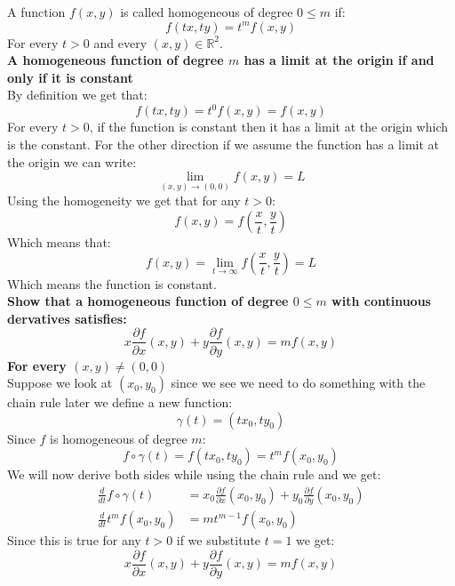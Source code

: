 \documentclass{article}
\theoremstyle{plain}
\newcommand{\R}{\mathbb{R}}
\begin{document}
	\newpage
	
	A function $f(x,y)$ is called homogeneous of degree $0 \le m$ if:
	\[
		f(tx,ty) = t^m f(x,y)
	\]
	For every $t > 0$ and every $(x,y) \in \R^2$. \\
	\textbf{A homogeneous function of degree $m$ has a limit at the origin
	if and only if it is constant} \\
	By definition we get that:
	\[
		f(tx,ty) = t^0 f(x,y) = f(x,y)
	\]
	For every $t > 0$, if the function is constant then it has a limit
	at the origin which is the constant. For the other direction if
	we assume the function has a limit at the origin we can write:
	\[
		\lim_{(x,y)\to(0,0)}{f(x,y)} = L
	\]
	Using the homogeneity we get that for any $t > 0$:
	\[
		f(x,y) = f\left(\frac{x}{t},\frac{y}{t}\right)
	\]
	Which means that:
	\[
		f(x,y) = \lim_{t\to\infty}{f\left(\frac{x}{t},\frac{y}{t}\right)} = L
	\]
	Which means the function is constant. \\
	\textbf{Show that a homogeneous function of degree $0 \le m$ with
	continuous dervatives satisfies:
	\[
		x \frac{\partial f}{\partial x}(x,y) + 
		y \frac{\partial f}{\partial y}(x,y) = 
		mf(x,y)
	\]
	For every $(x,y) \neq (0,0)$} \\
	Suppose we look at $(x_0,y_0)$ since we see we need to do something
	with the chain rule later we define a new function:
	\[
		\gamma(t) = (tx_0,ty_0)
	\]
	Since $f$ is homogeneous of degree $m$:
	\[
		f\circ\gamma(t) = f(tx_0,ty_0) = t^mf(x_0,y_0)
	\]
	We will now derive both sides while using the chain rule and we get:
	\begin{align*}
		\frac{d}{dt}f\circ\gamma(t) &= 
		x_0 \frac{\partial f}{\partial x}(x_0,y_0) + 
		y_0 \frac{\partial f}{\partial y}(x_0,y_0) \\
		\frac{d}{dt}t^mf(x_0,y_0) &= mt^{m-1}f(x_0,y_0)
	\end{align*}
	Since this is true for any $t > 0$ if we substitute $t = 1$ we get:
	\[
		x \frac{\partial f}{\partial x}(x,y) + 
		y \frac{\partial f}{\partial y}(x,y) = 
		mf(x,y)
	\]
	
	\newpage
	\iffalse
	\textbf{Show that any homogeneous function can be written as:
	\[
		f(x,y) = x^m F\left(\frac{y}{x}\right)
	\]
	For any $x \neq 0$} \\
	This is true because without loss of generality assume $x > 0$ we
	get that $t = \frac{1}{x} > 0$ and then we know that:
	\[
		f(x,y) = \left(\frac{1}{x}\right)^m f\left(1,\frac{y}{x}\right)
	\]
	Which means that if we denote 
	$F\left(\frac{y}{x}\right) = f\left(1,\frac{y}{x}\right)$ we get:
	\[
		f(x,y) = \left(\frac{1}{x}\right)^m F\left(\frac{y}{x}\right)
	\]
	\fi
	
\end{document}

